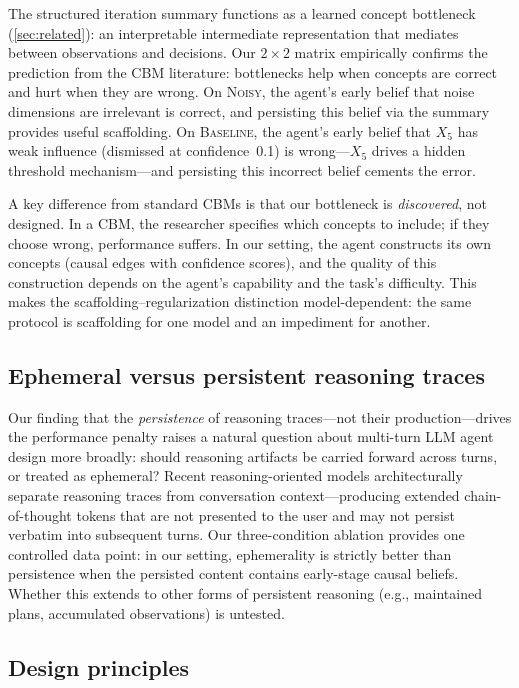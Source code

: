 \documentclass[11pt,letterpaper]{article}
\newcommand{\oracle}[1]{\textsc{#1}}
\newcommand{\baseline}{\oracle{Baseline}}
\newcommand{\noisy}{\oracle{Noisy}}
\begin{document}
The structured iteration summary functions as a learned concept
bottleneck (\cref{sec:related}): an interpretable intermediate
representation that mediates between observations and decisions. Our
$2 \times 2$ matrix empirically confirms the prediction from the CBM
literature: bottlenecks help when concepts are correct and hurt when
they are wrong. On \noisy{}, the agent's early belief that noise
dimensions are irrelevant is correct, and persisting this belief via the
summary provides useful scaffolding. On \baseline{}, the agent's early
belief that $X_5$ has weak influence (dismissed at confidence~0.1) is
wrong---$X_5$ drives a hidden threshold mechanism---and persisting this
incorrect belief cements the error.

A key difference from standard CBMs is that our bottleneck is
\emph{discovered}, not designed. In a CBM, the researcher specifies
which concepts to include; if they choose wrong, performance suffers.
In our setting, the agent constructs its own concepts (causal edges with
confidence scores), and the quality of this construction depends on the
agent's capability and the task's difficulty. This makes the
scaffolding--regularization distinction model-dependent: the same
protocol is scaffolding for one model and an impediment for another.

\subsection{Ephemeral versus persistent reasoning traces}

Our finding that the \emph{persistence} of reasoning traces---not their
production---drives the performance penalty raises a natural question
about multi-turn LLM agent design more broadly: should reasoning
artifacts be carried forward across turns, or treated as ephemeral?
Recent reasoning-oriented models architecturally separate reasoning
traces from conversation context---producing extended chain-of-thought
tokens that are not presented to the user and may not persist verbatim
into subsequent turns. Our three-condition ablation provides one
controlled data point: in our setting, ephemerality is strictly better
than persistence when the persisted content contains early-stage causal
beliefs. Whether this extends to other forms of persistent reasoning
(e.g., maintained plans, accumulated observations) is untested.

\subsection{Design principles}
\end{document}
